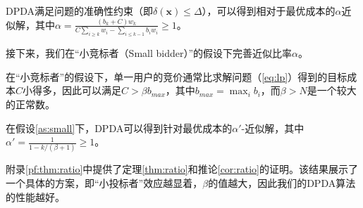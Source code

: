 	\begin{thm}\label{thm:ratio}
		DPDA满足问题的准确性约束（即$\delta(\mathbf{x})\le \Delta$），可以得到相对于最优成本的$\alpha$近似解，其中$\alpha=\frac{(b_k+C)w_k}{C\sum_{i\ge k}w_i-\sum_{i\le k-1}b_iw_i}\ge 1$。
	\end{thm} 
	
	接下来，我们在“小竞标者（Small bidder）”的假设下完善近似比率$\alpha$。
	\begin{as}\label{as:small}
	在“小竞标者”的假设下，单一用户的竞价通常比求解问题（\ref{eq:lp}）得到的目标成本$C$小得多，因此可以满足$C>\beta b_{max}$，其中$b_{max}=\max_ib_i$，而$\beta>N$是一个较大的正常数。
	\end{as}
	
	\begin{cor}\label{cor:ratio}
		在假设\ref{as:small}下，DPDA可以得到针对最优成本的$\alpha'$-近似解，其中$\alpha'=\frac{1}{1-k/(\beta+1)}\ge 1$。
	\end{cor} 
	附录\ref{pf:thm:ratio}中提供了定理\ref{thm:ratio}和推论\ref{cor:ratio}的证明。该结果展示了一个具体的方案，即“小投标者”效应越显着，$\beta$的值越大，因此我们的DPDA算法的性能越好。

